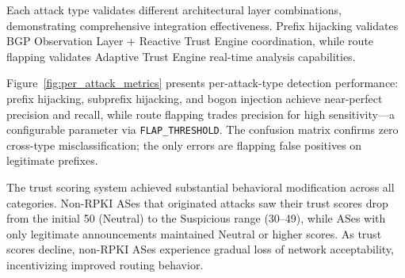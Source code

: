 Each attack type validates different architectural layer combinations, demonstrating comprehensive integration effectiveness. Prefix hijacking validates BGP Observation Layer + Reactive Trust Engine coordination, while route flapping validates Adaptive Trust Engine real-time analysis capabilities.

Figure~\ref{fig:per_attack_metrics} presents per-attack-type detection performance: prefix hijacking, subprefix hijacking, and bogon injection achieve near-perfect precision and recall, while route flapping trades precision for high sensitivity---a configurable parameter via \texttt{FLAP\_THRESHOLD}. The confusion matrix confirms zero cross-type misclassification; the only errors are flapping false positives on legitimate prefixes.



The trust scoring system achieved substantial behavioral modification across all categories. Non-RPKI ASes that originated attacks saw their trust scores drop from the initial 50 (Neutral) to the Suspicious range (30--49), while ASes with only legitimate announcements maintained Neutral or higher scores. As trust scores decline, non-RPKI ASes experience gradual loss of network acceptability, incentivizing improved routing behavior.


